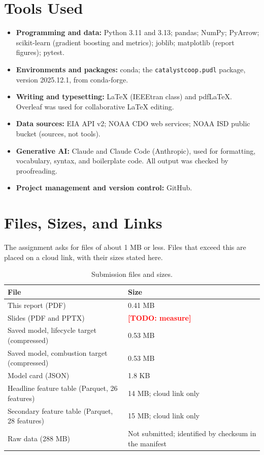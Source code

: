 \documentclass[10pt,journal,compsoc]{IEEEtran}
\newcommand{\todo}[1]{\textcolor{red}{\textbf{[TODO: #1]}}}
\begin{document}
\section{Tools Used}
\label{app:tools}

\begin{itemize}
\item \textbf{Programming and data:} Python 3.11 and 3.13; pandas; NumPy; PyArrow; scikit-learn (gradient boosting and metrics); joblib; matplotlib (report figures); pytest.
\item \textbf{Environments and packages:} conda; the \texttt{catalystcoop.pudl} package, version 2025.12.1, from conda-forge.
\item \textbf{Writing and typesetting:} LaTeX (IEEEtran class) and pdfLaTeX. Overleaf was used for collaborative LaTeX editing.
\item \textbf{Data sources:} EIA API v2; NOAA CDO web services; NOAA ISD public bucket (sources, not tools).
\item \textbf{Generative AI:} Claude and Claude Code (Anthropic), used for formatting, vocabulary, syntax, and boilerplate code. All output was checked by proofreading.
\item \textbf{Project management and version control:} GitHub.
\end{itemize}

\section{Files, Sizes, and Links}
\label{app:files}

The assignment asks for files of about 1 MB or less. Files that exceed this are placed on a cloud link, with their sizes stated here.

\begin{table}[t]
\caption{Submission files and sizes.}
\label{tab:files}
\centering
\small
\begin{tabular}{@{}p{7.5cm}p{4.5cm}@{}}
\toprule
File & Size \\
\midrule
This report (PDF) & 0.41 MB \\
Slides (PDF and PPTX) & \todo{measure} \\
Saved model, lifecycle target (compressed) & 0.53 MB \\
Saved model, combustion target (compressed) & 0.53 MB \\
Model card (JSON) & 1.8 KB \\
Headline feature table (Parquet, 26 features) & 14 MB; cloud link only \\
Secondary feature table (Parquet, 28 features) & 15 MB; cloud link only \\
Raw data (288 MB) & Not submitted; identified by checksum in the manifest \\
\bottomrule
\end{tabular}
\end{table}
\end{document}
